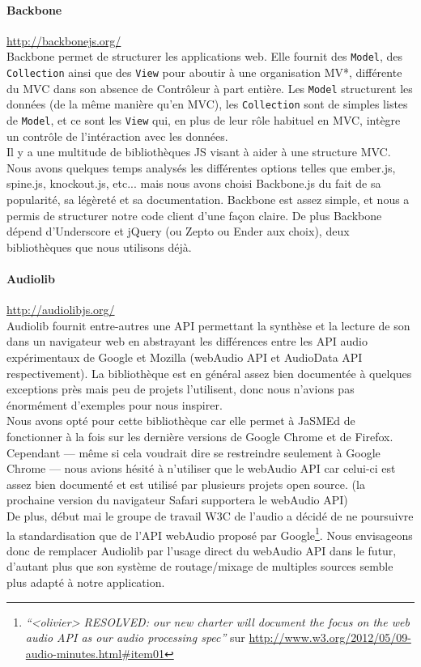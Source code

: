 \documentclass[12pt,a4paper]{article}
\begin{document}
\paragraph{Backbone}\url{http://backbonejs.org/}\\
Backbone permet de structurer les applications web. Elle fournit des \texttt{Model}, des \texttt{Collection} ainsi que des \texttt{View} pour aboutir à une organisation MV*, différente du MVC dans son absence de Contrôleur à part entière. Les \texttt{Model} structurent les données (de la même manière qu’en MVC), les \texttt{Collection} sont de simples listes de \texttt{Model}, et ce sont les \texttt{View} qui, en plus de leur rôle habituel en MVC, intègre un contrôle de l’intéraction avec les données.\\
Il y a une multitude de bibliothèques JS visant à aider à une structure MVC. Nous avons quelques temps analysés les différentes options telles que ember.js, spine.js, knockout.js, etc... mais nous avons choisi Backbone.js du fait de sa popularité, sa légèreté et sa documentation. Backbone est assez simple, et nous a permis de structurer notre code client d’une façon claire. De plus Backbone dépend d’Underscore et jQuery (ou Zepto ou Ender aux choix), deux bibliothèques que nous utilisons déjà.

\paragraph{Audiolib}\url{http://audiolibjs.org/}\\
Audiolib fournit entre-autres une API permettant la synthèse et la lecture de son dans un navigateur web en abstrayant les différences entre les API audio expérimentaux de Google et Mozilla (webAudio API et AudioData API respectivement). La bibliothèque est en général assez bien documentée à quelques exceptions près mais peu de projets l’utilisent, donc nous n’avions pas énormément d’exemples pour nous inspirer.\\
Nous avons opté pour cette bibliothèque car elle permet à JaSMEd de fonctionner à la fois sur les dernière versions de Google Chrome et de Firefox. Cependant — même si cela voudrait dire se restreindre seulement à Google Chrome — nous avions hésité à n’utiliser que le webAudio API car celui-ci est assez bien documenté et est utilisé par plusieurs projets open source. (la prochaine version du navigateur Safari supportera le webAudio API)\\
De plus, début mai le groupe de travail W3C de l’audio a décidé de ne poursuivre la standardisation que de l’API webAudio proposé par Google\footnote{\emph{“<olivier> RESOLVED: our new charter will document the focus on the web audio API as our audio processing spec”} sur \url{http://www.w3.org/2012/05/09-audio-minutes.html#item01}}. Nous envisageons donc de remplacer Audiolib par l’usage direct du webAudio API dans le futur, d’autant plus que son système de routage/mixage de multiples sources semble plus adapté à notre application.
\end{document}

